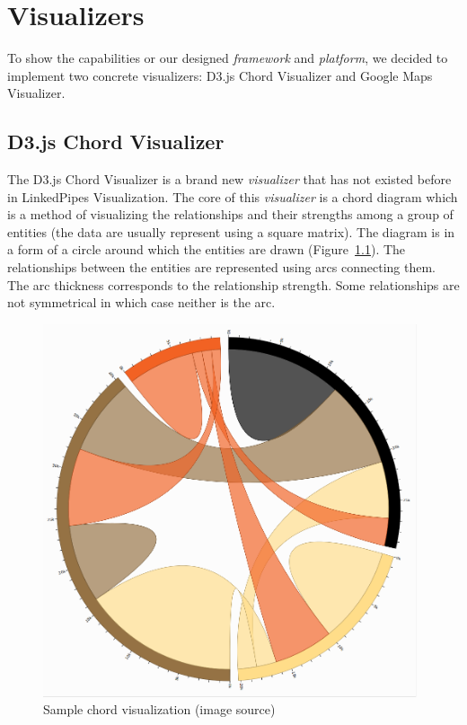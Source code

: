 \chapter{Visualizers}
\label{chap:visualizers}

To show the capabilities or our designed \emph{framework} and \emph{platform}, we decided to implement two concrete visualizers: D3.js Chord Visualizer and Google Maps Visualizer.

\section{D3.js Chord Visualizer}
\label{sec:visualizers:chord}

The D3.js Chord Visualizer is a brand new \emph{visualizer} that has not existed before in LinkedPipes Visualization. The core of this \emph{visualizer} is a chord diagram which is a method of visualizing the relationships and their strengths among a group of entities (the data are usually represent using a square matrix). The diagram is in a form of a circle around which the entities are drawn (Figure~\ref{fig:chord-example}). The relationships between the entities are represented using arcs connecting them. The arc thickness corresponds to the relationship strength. Some relationships are not symmetrical in which case neither is the arc.

\begin{figure}
	\centering
	\includegraphics[width=110mm]{img/06_chord_example.png}
	\caption[Sample chord visualization]{Sample chord visualization (image source\footnotemark)  }
	\label{fig:chord-example}
\end{figure}

